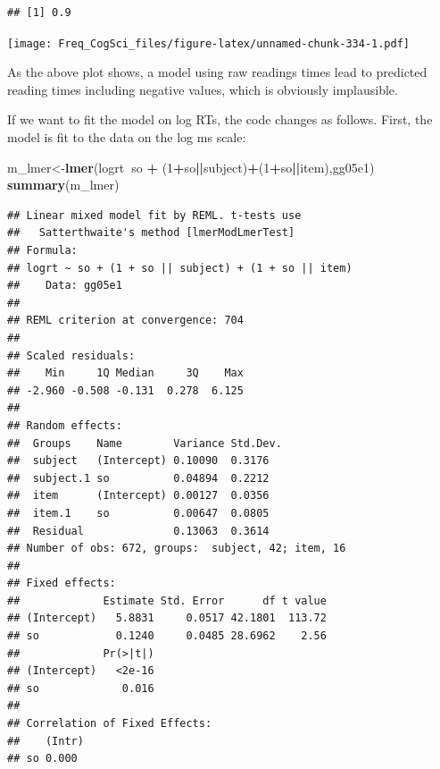 \documentclass[12pt,]{krantz}
\newenvironment{Shaded}{\begin{snugshade}}{\end{snugshade}}
\newcommand{\ControlFlowTok}[1]{\textcolor[rgb]{0.13,0.29,0.53}{\textbf{#1}}}
\newcommand{\DataTypeTok}[1]{\textcolor[rgb]{0.13,0.29,0.53}{#1}}
\newcommand{\DecValTok}[1]{\textcolor[rgb]{0.00,0.00,0.81}{#1}}
\newcommand{\KeywordTok}[1]{\textcolor[rgb]{0.13,0.29,0.53}{\textbf{#1}}}
\newcommand{\NormalTok}[1]{#1}
\newcommand{\OperatorTok}[1]{\textcolor[rgb]{0.81,0.36,0.00}{\textbf{#1}}}
\newcommand{\OtherTok}[1]{\textcolor[rgb]{0.56,0.35,0.01}{#1}}
\newcommand{\StringTok}[1]{\textcolor[rgb]{0.31,0.60,0.02}{#1}}
\begin{document}
\begin{verbatim}
## [1] 0.9
\end{verbatim}

\begin{Shaded}
\end{Shaded}

\texttt{[image: Freq\_CogSci\_files/figure-latex/unnamed-chunk-334-1.pdf]}

As the above plot shows, a model using raw readings times lead to predicted reading times including negative values, which is obviously implausible.

If we want to fit the model on log RTs, the code changes as follows.
First, the model is fit to the data on the log ms scale:

\begin{Shaded}
\begin{Highlighting}[]
\NormalTok{m_lmer<-}\KeywordTok{lmer}\NormalTok{(logrt}\OperatorTok{~}\NormalTok{so }\OperatorTok{+}\StringTok{ }\NormalTok{(}\DecValTok{1}\OperatorTok{+}\NormalTok{so}\OperatorTok{||}\NormalTok{subject)}\OperatorTok{+}\NormalTok{(}\DecValTok{1}\OperatorTok{+}\NormalTok{so}\OperatorTok{||}\NormalTok{item),gg05e1)}
\KeywordTok{summary}\NormalTok{(m_lmer)}
\end{Highlighting}
\end{Shaded}

\begin{verbatim}
## Linear mixed model fit by REML. t-tests use
##   Satterthwaite's method [lmerModLmerTest]
## Formula: 
## logrt ~ so + (1 + so || subject) + (1 + so || item)
##    Data: gg05e1
## 
## REML criterion at convergence: 704
## 
## Scaled residuals: 
##    Min     1Q Median     3Q    Max 
## -2.960 -0.508 -0.131  0.278  6.125 
## 
## Random effects:
##  Groups    Name        Variance Std.Dev.
##  subject   (Intercept) 0.10090  0.3176  
##  subject.1 so          0.04894  0.2212  
##  item      (Intercept) 0.00127  0.0356  
##  item.1    so          0.00647  0.0805  
##  Residual              0.13063  0.3614  
## Number of obs: 672, groups:  subject, 42; item, 16
## 
## Fixed effects:
##             Estimate Std. Error      df t value
## (Intercept)   5.8831     0.0517 42.1801  113.72
## so            0.1240     0.0485 28.6962    2.56
##             Pr(>|t|)
## (Intercept)   <2e-16
## so             0.016
## 
## Correlation of Fixed Effects:
##    (Intr)
## so 0.000
\end{verbatim}
\end{document}
